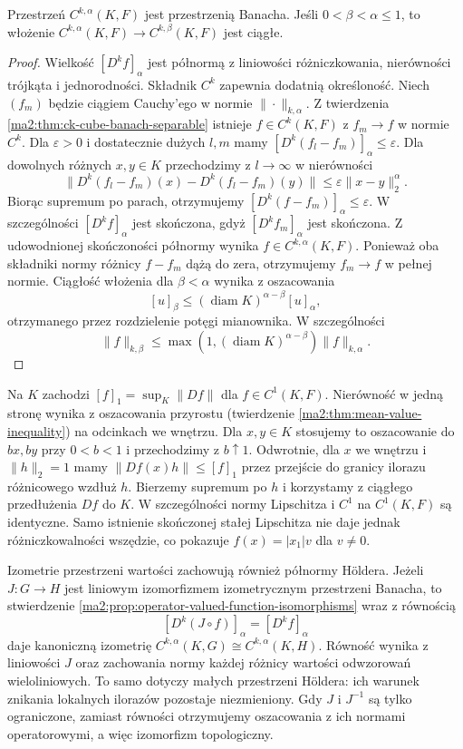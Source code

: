 \begin{twierdzenie}[Zupełność]
\label{ma2:thm:holder-banach}
Przestrzeń $C^{k,\alpha}(K,F)$ jest przestrzenią
Banacha. Jeśli $0<\beta<\alpha\le1$, to
włożenie $C^{k,\alpha}(K,F)\to C^{k,\beta}(K,F)$
jest ciągłe.
\end{twierdzenie}
\begin{proof}
Wielkość $[D^kf]_\alpha$ jest półnormą
z liniowości różniczkowania, nierówności
trójkąta i jednorodności. Składnik $C^k$
zapewnia dodatnią określoność.
Niech $(f_m)$ będzie ciągiem Cauchy'ego
w normie $\|\cdot\|_{k,\alpha}$.
Z twierdzenia \ref{ma2:thm:ck-cube-banach-separable}
istnieje $f\in C^k(K,F)$ z $f_m\to f$
w normie $C^k$. Dla $\varepsilon>0$
i dostatecznie dużych $l,m$ mamy
$[D^k(f_l-f_m)]_\alpha\le\varepsilon$.
Dla dowolnych różnych $x,y\in K$
przechodzimy z $l\to\infty$ w nierówności
\[
 \|D^k(f_l-f_m)(x)-D^k(f_l-f_m)(y)\|
 \le\varepsilon\|x-y\|_2^\alpha.
\]
Biorąc supremum po parach, otrzymujemy
$[D^k(f-f_m)]_\alpha\le\varepsilon$.
W szczególności $[D^kf]_\alpha$ jest skończona,
gdyż $[D^kf_m]_\alpha$ jest skończona.
Z udowodnionej skończoności półnormy wynika
$f\in C^{k,\alpha}(K,F)$. Ponieważ oba składniki
normy różnicy $f-f_m$ dążą do zera,
otrzymujemy $f_m\to f$ w pełnej normie.
Ciągłość włożenia dla $\beta<\alpha$
wynika z oszacowania
\[
 [u]_\beta\le(\operatorname{diam}K)^{\alpha-\beta}
 [u]_\alpha,
\]
otrzymanego przez rozdzielenie potęgi mianownika.
W szczególności
\[
 \|f\|_{k,\beta}\le
 \max(1,(\operatorname{diam}K)^{\alpha-\beta})
 \|f\|_{k,\alpha}.
\]
\end{proof}

Na $K$ zachodzi $[f]_1=\sup_K\|Df\|$
dla $f\in C^1(K,F)$. Nierówność w jedną
stronę wynika z oszacowania przyrostu
(twierdzenie \ref{ma2:thm:mean-value-inequality})
na odcinkach we wnętrzu. Dla $x,y\in K$
stosujemy to oszacowanie do $bx,by$ przy
$0<b<1$ i przechodzimy z $b\uparrow1$.
Odwrotnie, dla $x$ we wnętrzu i $\|h\|_2=1$
mamy $\|Df(x)h\|\le[f]_1$ przez przejście
do granicy ilorazu różnicowego wzdłuż $h$.
Bierzemy supremum po $h$ i korzystamy
z ciągłego przedłużenia $Df$ do $K$.
W szczególności normy Lipschitza i $C^1$
na $C^1(K,F)$ są identyczne.
Samo istnienie skończonej stałej Lipschitza
nie daje jednak różniczkowalności wszędzie,
co pokazuje $f(x)=|x_1|v$ dla $v\ne0$.

Izometrie przestrzeni wartości zachowują również
półnormy H\"oldera. Jeżeli $J:G\to H$ jest
liniowym izomorfizmem izometrycznym przestrzeni
Banacha, to stwierdzenie
\ref{ma2:prop:operator-valued-function-isomorphisms}
wraz z równością
\[
 [D^k(J\circ f)]_\alpha=[D^kf]_\alpha
\]
daje kanoniczną izometrię $C^{k,\alpha}(K,G)
\cong C^{k,\alpha}(K,H)$. Równość wynika z liniowości
$J$ oraz zachowania normy każdej różnicy wartości
odwzorowań wieloliniowych. To samo dotyczy małych
przestrzeni H\"oldera: ich warunek znikania lokalnych
ilorazów pozostaje niezmieniony. Gdy $J$ i $J^{-1}$
są tylko ograniczone, zamiast równości otrzymujemy
oszacowania z ich normami operatorowymi, a więc
izomorfizm topologiczny.

